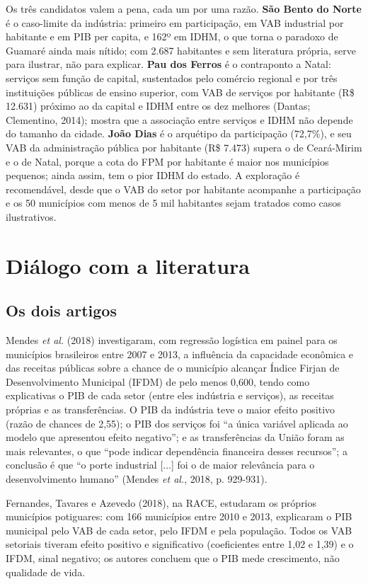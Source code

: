 \documentclass[12pt,a4paper]{article}
\begin{document}
Os três candidatos valem a pena, cada um por uma razão. \textbf{São Bento do Norte} é o caso-limite da indústria: primeiro em participação, em VAB industrial por habitante e em PIB per capita, e 162º em IDHM, o que torna o paradoxo de Guamaré ainda mais nítido; com 2.687 habitantes e sem literatura própria, serve para ilustrar, não para explicar. \textbf{Pau dos Ferros} é o contraponto a Natal: serviços sem função de capital, sustentados pelo comércio regional e por três instituições públicas de ensino superior, com VAB de serviços por habitante (R\$ 12.631) próximo ao da capital e IDHM entre os dez melhores (Dantas; Clementino, 2014); mostra que a associação entre serviços e IDHM não depende do tamanho da cidade. \textbf{João Dias} é o arquétipo da participação (72,7\%), e seu VAB da administração pública por habitante (R\$ 7.473) supera o de Ceará-Mirim e o de Natal, porque a cota do FPM por habitante é maior nos municípios pequenos; ainda assim, tem o pior IDHM do estado. A exploração é recomendável, desde que o VAB do setor por habitante acompanhe a participação e os 50 municípios com menos de 5 mil habitantes sejam tratados como casos ilustrativos.

\section{Diálogo com a literatura}

\subsection{Os dois artigos}

Mendes \textit{et al.} (2018) investigaram, com regressão logística em painel para os municípios brasileiros entre 2007 e 2013, a influência da capacidade econômica e das receitas públicas sobre a chance de o município alcançar Índice Firjan de Desenvolvimento Municipal (IFDM) de pelo menos 0,600, tendo como explicativas o PIB de cada setor (entre eles indústria e serviços), as receitas próprias e as transferências. O PIB da indústria teve o maior efeito positivo (razão de chances de 2,55); o PIB dos serviços foi ``a única variável aplicada ao modelo que apresentou efeito negativo''; e as transferências da União foram as mais relevantes, o que ``pode indicar dependência financeira desses recursos''; a conclusão é que ``o porte industrial [...] foi o de maior relevância para o desenvolvimento humano'' (Mendes \textit{et al.}, 2018, p. 929-931).

Fernandes, Tavares e Azevedo (2018), na RACE, estudaram os próprios municípios potiguares: com 166 municípios entre 2010 e 2013, explicaram o PIB municipal pelo VAB de cada setor, pelo IFDM e pela população. Todos os VAB setoriais tiveram efeito positivo e significativo (coeficientes entre 1,02 e 1,39) e o IFDM, sinal negativo; os autores concluem que o PIB mede crescimento, não qualidade de vida.
\end{document}
